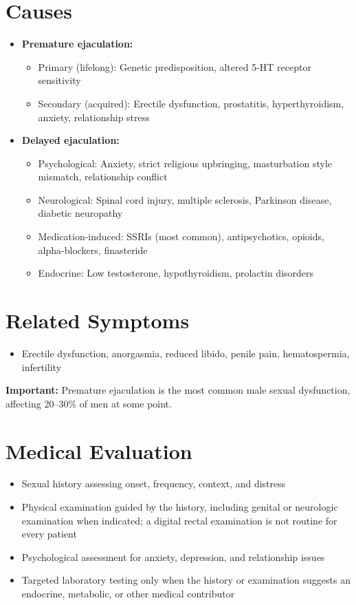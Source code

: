 \section*{Causes}
\begin{itemize}
  \item \textbf{Premature ejaculation:}
    \begin{itemize}
      \item Primary (lifelong): Genetic predisposition, altered 5-HT receptor sensitivity
      \item Secondary (acquired): Erectile dysfunction, prostatitis, hyperthyroidism, anxiety, relationship stress
    \end{itemize}
  \item \textbf{Delayed ejaculation:}
    \begin{itemize}
      \item Psychological: Anxiety, strict religious upbringing, masturbation style mismatch, relationship conflict
      \item Neurological: Spinal cord injury, multiple sclerosis, Parkinson disease, diabetic neuropathy
      \item Medication-induced: SSRIs (most common), antipsychotics, opioids, alpha-blockers, finasteride
      \item Endocrine: Low testosterone, hypothyroidism, prolactin disorders
    \end{itemize}
\end{itemize}

\section*{Related Symptoms}
\begin{itemize}
  \item Erectile dysfunction, anorgasmia, reduced libido, penile pain, hematospermia, infertility
\end{itemize}
\textbf{Important:} Premature ejaculation is the most common male sexual dysfunction, affecting 20--30\% of men at some point.

\section*{Medical Evaluation}
\begin{itemize}
  \item Sexual history assessing onset, frequency, context, and distress
  \item Physical examination guided by the history, including genital or neurologic examination when indicated; a digital rectal examination is not routine for every patient
  \item Psychological assessment for anxiety, depression, and relationship issues
  \item Targeted laboratory testing only when the history or examination suggests an endocrine, metabolic, or other medical contributor
\end{itemize}

